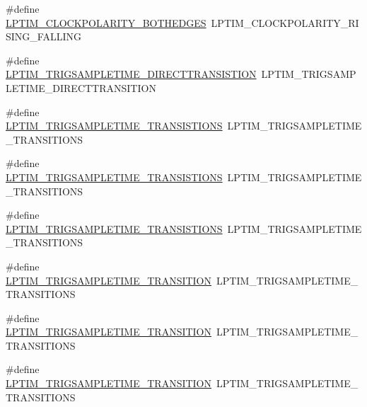 \begin{DoxyCompactItemize}
\item 
\#define \hyperlink{group___h_a_l___l_p_t_i_m___aliased___defines_gabc1f42481e4ab583e9d197ff38c93871}{L\+P\+T\+I\+M\+\_\+\+C\+L\+O\+C\+K\+P\+O\+L\+A\+R\+I\+T\+Y\+\_\+\+B\+O\+T\+H\+E\+D\+G\+ES}~L\+P\+T\+I\+M\+\_\+\+C\+L\+O\+C\+K\+P\+O\+L\+A\+R\+I\+T\+Y\+\_\+\+R\+I\+S\+I\+N\+G\+\_\+\+F\+A\+L\+L\+I\+NG
\item 
\#define \hyperlink{group___h_a_l___l_p_t_i_m___aliased___defines_gac5bc86549874c69c811a5cca277e994d}{L\+P\+T\+I\+M\+\_\+\+T\+R\+I\+G\+S\+A\+M\+P\+L\+E\+T\+I\+M\+E\+\_\+\+D\+I\+R\+E\+C\+T\+T\+R\+A\+N\+S\+I\+S\+T\+I\+ON}~L\+P\+T\+I\+M\+\_\+\+T\+R\+I\+G\+S\+A\+M\+P\+L\+E\+T\+I\+M\+E\+\_\+\+D\+I\+R\+E\+C\+T\+T\+R\+A\+N\+S\+I\+T\+I\+ON
\item 
\#define \hyperlink{group___h_a_l___l_p_t_i_m___aliased___defines_ga064ebb4bef8533495f233405b0124154}{L\+P\+T\+I\+M\+\_\+\+T\+R\+I\+G\+S\+A\+M\+P\+L\+E\+T\+I\+M\+E\+\_\+T\+R\+A\+N\+S\+I\+S\+T\+I\+O\+NS}~L\+P\+T\+I\+M\+\_\+\+T\+R\+I\+G\+S\+A\+M\+P\+L\+E\+T\+I\+M\+E\+\_\+T\+R\+A\+N\+S\+I\+T\+I\+O\+NS
\item 
\#define \hyperlink{group___h_a_l___l_p_t_i_m___aliased___defines_ga1378b21822817efcc982321b8d4fd43b}{L\+P\+T\+I\+M\+\_\+\+T\+R\+I\+G\+S\+A\+M\+P\+L\+E\+T\+I\+M\+E\+\_\+T\+R\+A\+N\+S\+I\+S\+T\+I\+O\+NS}~L\+P\+T\+I\+M\+\_\+\+T\+R\+I\+G\+S\+A\+M\+P\+L\+E\+T\+I\+M\+E\+\_\+T\+R\+A\+N\+S\+I\+T\+I\+O\+NS
\item 
\#define \hyperlink{group___h_a_l___l_p_t_i_m___aliased___defines_ga0ccedeec75232b9b367ed66618e99f03}{L\+P\+T\+I\+M\+\_\+\+T\+R\+I\+G\+S\+A\+M\+P\+L\+E\+T\+I\+M\+E\+\_\+T\+R\+A\+N\+S\+I\+S\+T\+I\+O\+NS}~L\+P\+T\+I\+M\+\_\+\+T\+R\+I\+G\+S\+A\+M\+P\+L\+E\+T\+I\+M\+E\+\_\+T\+R\+A\+N\+S\+I\+T\+I\+O\+NS
\item 
\#define \hyperlink{group___h_a_l___l_p_t_i_m___aliased___defines_gaec4cd82bdedd75361451197f6a980611}{L\+P\+T\+I\+M\+\_\+\+T\+R\+I\+G\+S\+A\+M\+P\+L\+E\+T\+I\+M\+E\+\_\+T\+R\+A\+N\+S\+I\+T\+I\+ON}~L\+P\+T\+I\+M\+\_\+\+T\+R\+I\+G\+S\+A\+M\+P\+L\+E\+T\+I\+M\+E\+\_\+T\+R\+A\+N\+S\+I\+T\+I\+O\+NS
\item 
\#define \hyperlink{group___h_a_l___l_p_t_i_m___aliased___defines_gaeaa42d9ce35665034a147ea178bae0e9}{L\+P\+T\+I\+M\+\_\+\+T\+R\+I\+G\+S\+A\+M\+P\+L\+E\+T\+I\+M\+E\+\_\+T\+R\+A\+N\+S\+I\+T\+I\+ON}~L\+P\+T\+I\+M\+\_\+\+T\+R\+I\+G\+S\+A\+M\+P\+L\+E\+T\+I\+M\+E\+\_\+T\+R\+A\+N\+S\+I\+T\+I\+O\+NS
\item 
\#define \hyperlink{group___h_a_l___l_p_t_i_m___aliased___defines_ga6a8ba91e773bad9196923ae44d8865d3}{L\+P\+T\+I\+M\+\_\+\+T\+R\+I\+G\+S\+A\+M\+P\+L\+E\+T\+I\+M\+E\+\_\+T\+R\+A\+N\+S\+I\+T\+I\+ON}~L\+P\+T\+I\+M\+\_\+\+T\+R\+I\+G\+S\+A\+M\+P\+L\+E\+T\+I\+M\+E\+\_\+T\+R\+A\+N\+S\+I\+T\+I\+O\+NS
\end{DoxyCompactItemize}


